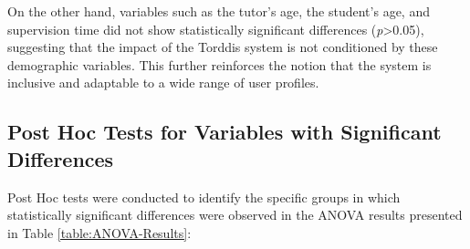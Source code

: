                On the other hand, variables such as the tutor’s age, the student’s age, and supervision time did not show statistically significant differences (\textit{p}>0.05), suggesting that the impact of the Torddis system is not conditioned by these demographic variables. This further reinforces the notion that the system is inclusive and adaptable to a wide range of user profiles.
                
                \subsection{Post Hoc Tests for Variables with Significant Differences}
                Post Hoc tests \citep{Ogrodniczek2025Comparative} were conducted to identify the specific groups in which statistically significant differences were observed in the ANOVA results presented in Table \ref{table:ANOVA-Results}:
                
